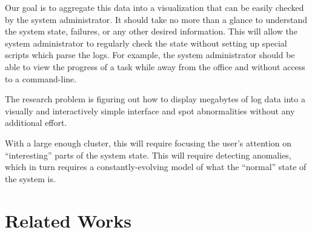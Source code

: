 \documentclass[conference]{style/acmsiggraph}
\begin{document}
Our goal is to aggregate this data into a visualization that can be easily checked by the system
administrator. It should take no more than a glance to understand the system state, failures, or any
other desired information. This will allow the system administrator to regularly check the state
without setting up special scripts which parse the logs. For example, the system administrator
should be able to view the progress of a task while away from the office and without access to a
command-line.

The research problem is figuring out how to display megabytes of log data into a visually and
interactively simple interface and spot abnormalities without any additional effort.

With a large enough cluster, this will require focusing the user’s attention on “interesting” parts
of the system state. This will require detecting anomalies, which in turn requires a
constantly-evolving model of what the “normal” state of the system is.


\section{Related Works}
\end{document}
